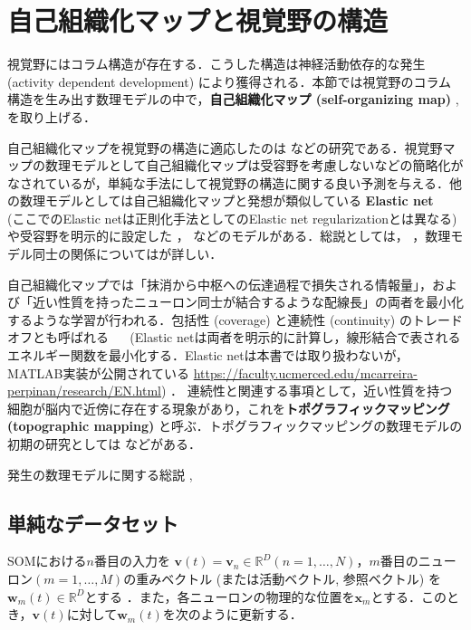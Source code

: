 \section{自己組織化マップと視覚野の構造}
視覚野にはコラム構造が存在する．こうした構造は神経活動依存的な発生  (activity dependent development) により獲得される．本節では視覚野のコラム構造を生み出す数理モデルの中で，\textbf{自己組織化マップ (self-organizing map)} \cite{Kohonen1982-mn}, \cite{Kohonen2013-yt}を取り上げる．

自己組織化マップを視覚野の構造に適応したのは\cite{Obermayer1990-gq} \cite{N_V_Swindale1998-ri}などの研究である．視覚野マップの数理モデルとして自己組織化マップは受容野を考慮しないなどの簡略化がなされているが，単純な手法にして視覚野の構造に関する良い予測を与える．他の数理モデルとしては自己組織化マップと発想が類似している \textbf{Elastic net}  \cite{Durbin1987-bp} \cite{Durbin1990-xx} \cite{Carreira-Perpinan2005-gy}　(ここでのElastic netは正則化手法としてのElastic net regularizationとは異なる)や受容野を明示的に設定した \cite{Tanaka2004-vz}， \cite{Ringach2007-oe}などのモデルがある．総説としては\cite{Das2005-mq}，\cite{Goodhill2007-va} ，数理モデル同士の関係については\cite{2002-nm}が詳しい．

自己組織化マップでは「抹消から中枢への伝達過程で損失される情報量」，および「近い性質を持ったニューロン同士が結合するような配線長」の両者を最小化するような学習が行われる．包括性 (coverage) と連続性 (continuity) のトレードオフとも呼ばれる \cite{Carreira-Perpinan2005-gy}　 (Elastic netは両者を明示的に計算し，線形結合で表されるエネルギー関数を最小化する．Elastic netは本書では取り扱わないが，MATLAB実装が公開されている
\url{https://faculty.ucmerced.edu/mcarreira-perpinan/research/EN.html}) ． 連続性と関連する事項として，近い性質を持つ細胞が脳内で近傍に存在する現象があり，これを\textbf{トポグラフィックマッピング (topographic mapping)} と呼ぶ．トポグラフィックマッピングの数理モデルの初期の研究としては\cite{Von_der_Malsburg1973-bz} \cite{Willshaw1976-zo} \cite{Takeuchi1979-mi}などがある．

発生の数理モデルに関する総説 \cite{Van_Ooyen2011-fz}, \cite{Goodhill2018-ho}
\subsection{単純なデータセット}
SOMにおける$n$番目の入力を $\mathbf{v}(t)=\mathbf{v}_n\in \mathbb{R}^{D} (n=1, \ldots, N)$，$m$番目のニューロン$ (m=1, \ldots, M) $の重みベクトル (または活動ベクトル, 参照ベクトル) を$\mathbf{w}_m(t)\in \mathbb{R}^{D}$とする \cite{Kohonen2013-yt}．また，各ニューロンの物理的な位置を$\mathbf{x}_m$とする．このとき，$\mathbf{v}(t)$に対して$\mathbf{w}_m(t)$を次のように更新する．

